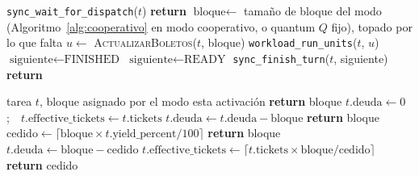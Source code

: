 \begin{algorithm}[htbp]
\caption{Ciclo del worker de la tarea $t$ (\texttt{worker\_thread\_main})}
\label{alg:worker}
\begin{algorithmic}[1]
\LOOP
  \STATE \texttt{sync\_wait\_for\_dispatch}($t$) 
    \STATE \textbf{return} 
  \ENDIF
  \STATE $\text{bloque} \gets$ tamaño de bloque del modo (Algoritmo~\ref{alg:cooperativo} en modo cooperativo, o quantum $Q$ fijo), topado por lo que falta
  \STATE $u \gets$ \textsc{ActualizarBoletos}($t$, bloque) 
  \STATE \texttt{workload\_run\_units}($t$, $u$) 
    \STATE $\text{siguiente} \gets \text{FINISHED}$
  \ELSE
    \STATE $\text{siguiente} \gets \text{READY}$
  \ENDIF
  \STATE \texttt{sync\_finish\_turn}($t$, siguiente) 
    \STATE \textbf{return}
  \ENDIF
\ENDLOOP
\end{algorithmic}
\end{algorithm}

\begin{algorithm}[htbp]
\caption{Cesión y actualización de boletos activos (\texttt{ActualizarBoletos}, extensión, Sección~\ref{sec:extension})}
\label{alg:actualizar-boletos}
\begin{algorithmic}[1]
\REQUIRE tarea $t$, bloque asignado por el modo esta activación
  \STATE \textbf{return} bloque 
\ENDIF
{}
    \STATE $t.\text{deuda} \gets 0$;\ \ $t.\text{effective\_tickets} \gets t.\text{tickets}$
  \ELSE
    \STATE $t.\text{deuda} \gets t.\text{deuda} - \text{bloque}$
  \ENDIF
  \STATE \textbf{return} bloque 
\ENDIF
\STATE $\text{cedido} \gets \lceil \text{bloque} \times t.\text{yield\_percent} / 100 \rceil$
  \STATE \textbf{return} bloque 
\ENDIF
{}
  \STATE $t.\text{deuda} \gets \text{bloque} - \text{cedido}$
  \STATE $t.\text{effective\_tickets} \gets \lceil t.\text{tickets} \times \text{bloque} / \text{cedido} \rceil$
\ENDIF
\STATE \textbf{return} cedido
\end{algorithmic}
\end{algorithm}

